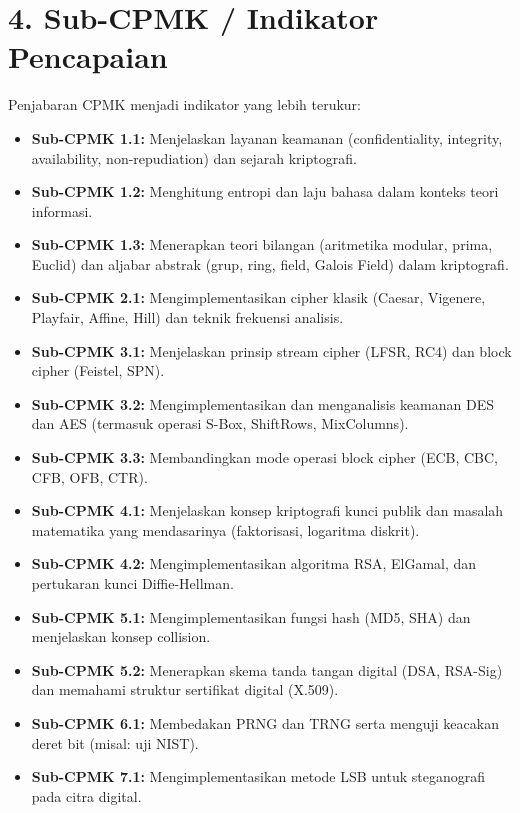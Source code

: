 \documentclass[12pt,a4paper]{article}
\begin{document}
\vspace{0.5cm}

\section*{4. Sub-CPMK / Indikator Pencapaian}

Penjabaran CPMK menjadi indikator yang lebih terukur:

\begin{itemize}[leftmargin=*]
  \item \textbf{Sub-CPMK 1.1:} Menjelaskan layanan keamanan (confidentiality, integrity, availability, non-repudiation) dan sejarah kriptografi.
  \item \textbf{Sub-CPMK 1.2:} Menghitung entropi dan laju bahasa dalam konteks teori informasi.
  \item \textbf{Sub-CPMK 1.3:} Menerapkan teori bilangan (aritmetika modular, prima, Euclid) dan aljabar abstrak (grup, ring, field, Galois Field) dalam kriptografi.
  \item \textbf{Sub-CPMK 2.1:} Mengimplementasikan cipher klasik (Caesar, Vigenere, Playfair, Affine, Hill) dan teknik frekuensi analisis.
  \item \textbf{Sub-CPMK 3.1:} Menjelaskan prinsip stream cipher (LFSR, RC4) dan block cipher (Feistel, SPN).
  \item \textbf{Sub-CPMK 3.2:} Mengimplementasikan dan menganalisis keamanan DES dan AES (termasuk operasi S-Box, ShiftRows, MixColumns).
  \item \textbf{Sub-CPMK 3.3:} Membandingkan mode operasi block cipher (ECB, CBC, CFB, OFB, CTR).
  \item \textbf{Sub-CPMK 4.1:} Menjelaskan konsep kriptografi kunci publik dan masalah matematika yang mendasarinya (faktorisasi, logaritma diskrit).
  \item \textbf{Sub-CPMK 4.2:} Mengimplementasikan algoritma RSA, ElGamal, dan pertukaran kunci Diffie-Hellman.
  \item \textbf{Sub-CPMK 5.1:} Mengimplementasikan fungsi hash (MD5, SHA) dan menjelaskan konsep collision.
  \item \textbf{Sub-CPMK 5.2:} Menerapkan skema tanda tangan digital (DSA, RSA-Sig) dan memahami struktur sertifikat digital (X.509).
  \item \textbf{Sub-CPMK 6.1:} Membedakan PRNG dan TRNG serta menguji keacakan deret bit (misal: uji NIST).
  \item \textbf{Sub-CPMK 7.1:} Mengimplementasikan metode LSB untuk steganografi pada citra digital.
\end{itemize}
\end{document}
